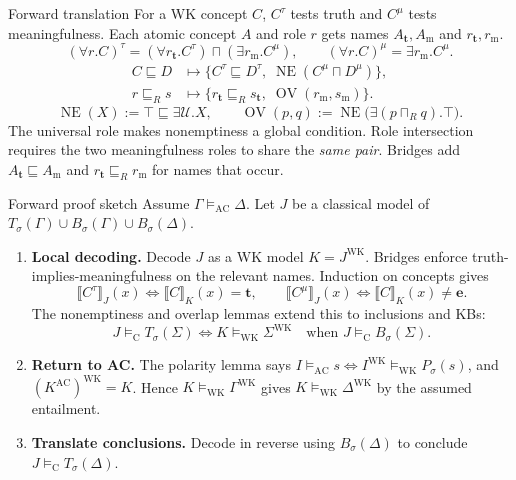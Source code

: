 \documentclass[aspectratio=169,10pt]{beamer}
\newcommand{\WK}{\mathrm{WK}}
\newcommand{\AC}{\mathrm{AC}}
\newcommand{\CL}{\mathrm{C}}
\newcommand{\NE}{\operatorname{NE}}
\newcommand{\OV}{\operatorname{OV}}
\newcommand{\val}[1]{\llbracket #1\rrbracket}
\newcommand{\ttv}{\mathbf t}
\newcommand{\eev}{\mathbf e}
\begin{document}
\begin{frame}[t]{Forward translation}
\small
For a WK concept $C$, $C^\tau$ tests truth and $C^\mu$ tests meaningfulness.
Each atomic concept $A$ and role $r$ gets names $A_{\ttv},A_{\mathrm m}$
and $r_{\ttv},r_{\mathrm m}$.
\[
  (\forall r.C)^\tau
  =(\forall r_{\ttv}.C^\tau)\sqcap(\exists r_{\mathrm m}.C^\mu),
  \qquad
  (\forall r.C)^\mu=\exists r_{\mathrm m}.C^\mu.
\]
\vspace{-0.6em}
\[
  \begin{aligned}
  C\sqsubseteq D
    &\longmapsto
      \bigl\{C^\tau\sqsubseteq D^\tau,\;
        \NE(C^\mu\sqcap D^\mu)\bigr\},\\
  r\sqsubseteq_R s
    &\longmapsto
      \bigl\{r_{\ttv}\sqsubseteq_R s_{\ttv},\;
        \OV(r_{\mathrm m},s_{\mathrm m})\bigr\}.
  \end{aligned}
\]
\vspace{-0.7em}
\[
  \NE(X):=\top\sqsubseteq\exists\mathcal U.X,\qquad
  \OV(p,q):=\NE\bigl(\exists(p\sqcap_R q).\top\bigr).
\]
The universal role makes nonemptiness a global condition. Role intersection
requires the two meaningfulness roles to share the \emph{same pair}.
Bridges add $A_{\ttv}\sqsubseteq A_{\mathrm m}$ and
$r_{\ttv}\sqsubseteq_R r_{\mathrm m}$ for names that occur.
\end{frame}

\begin{frame}[t]{Forward proof sketch}
\small
Assume $\Gamma\models_{\AC}\Delta$. Let $J$ be a classical model of
$T_\sigma(\Gamma)\cup B_\sigma(\Gamma)\cup B_\sigma(\Delta)$.
\medskip
\begin{enumerate}
  \item \textbf{Local decoding.} Decode $J$ as a WK model $K=J^{\WK}$.
  Bridges enforce truth-implies-meaningfulness on the relevant names.
  Induction on concepts gives
  \[
    \val{C^\tau}_J(x)\iff\val{C}_K(x)=\ttv,\qquad
    \val{C^\mu}_J(x)\iff\val{C}_K(x)\ne\eev.
  \]
  The nonemptiness and overlap lemmas extend this to inclusions and KBs:
  \[
    J\models_{\CL}T_\sigma(\Sigma)
    \iff K\models_{\WK}\Sigma^{\WK}
    \quad\text{when }J\models_{\CL}B_\sigma(\Sigma).
  \]
  \item \textbf{Return to AC.} The polarity lemma says
  $I\models_{\AC}s\iff I^{\WK}\models_{\WK}P_\sigma(s)$, and
  $(K^{\AC})^{\WK}=K$.
  Hence $K\models_{\WK}\Gamma^{\WK}$ gives
  $K\models_{\WK}\Delta^{\WK}$ by the assumed entailment.
  \item \textbf{Translate conclusions.} Decode in reverse using
  $B_\sigma(\Delta)$ to conclude $J\models_{\CL}T_\sigma(\Delta)$.
\end{enumerate}
\end{frame}
\end{document}
